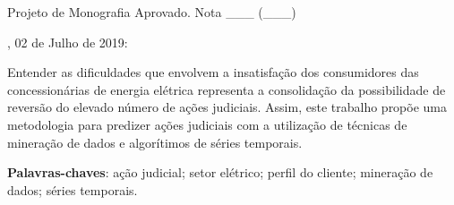 \documentclass[
	12pt,				%
	openany,
	oneside,
	a4paper,			%
	english,			%
	french,				%
	spanish,			%
	brazil,				%
	]{abntex2}
\begin{document}
\frenchspacing 


\imprimircapa

\imprimirfolhaderosto

\begin{folhadeaprovacao}

  \begin{center}
    {\ABNTEXchapterfont\large\imprimirautor}

    \vspace*{\fill}\vspace*{\fill}
    \begin{center}
      \ABNTEXchapterfont\bfseries\Large\imprimirtitulo
    \end{center}
    \vspace*{\fill}
    
    \hspace{.45\textwidth}
    \begin{minipage}{.5\textwidth}
        \imprimirpreambulo
    \end{minipage}%
    \vspace*{\fill}
   \end{center}
        
   Projeto de Monografia Aprovado. Nota \_\_\_ (\_\_\_) \par \imprimirlocal, 02 de Julho de 2019:

      
   \begin{center}
    \vspace*{0.5cm}
    {\large\imprimirlocal}
    \par
    {\large\imprimirdata}
    \vspace*{1cm}
  \end{center}
  
\end{folhadeaprovacao}


\setlength{\absparsep}{18pt} %

\begin{resumo}

Entender as dificuldades que envolvem a insatisfação dos consumidores das concessionárias de energia elétrica representa a consolidação da possibilidade de reversão do elevado número de ações judiciais. Assim, este trabalho propõe uma metodologia para predizer ações judiciais com a utilização de técnicas de mineração de dados e algorítimos de séries temporais.

 \noindent
\textbf{Palavras-chaves}: ação judicial; setor elétrico; perfil do cliente; mineração de dados; séries temporais.

\end{resumo}
\end{document}
